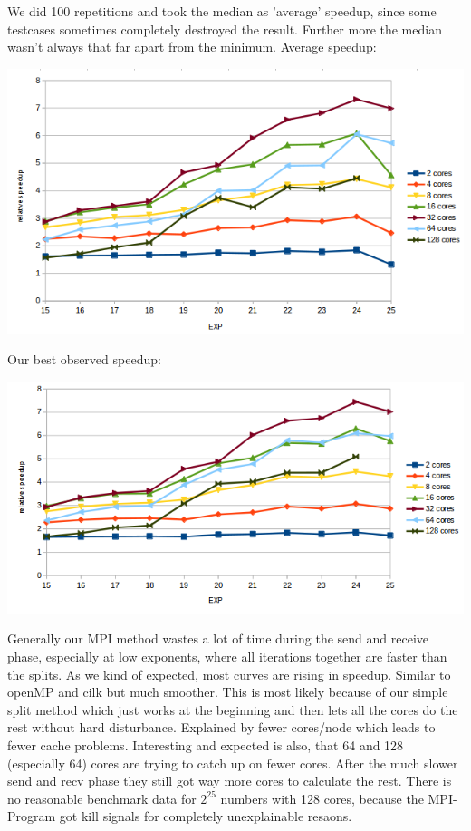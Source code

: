 We did 100 repetitions and took the median as 'average' speedup, since some testcases sometimes completely destroyed the result. Further more the median wasn't always that far apart from the minimum.\newline 
Average speedup:
\begin{center}
\includegraphics[width=\textwidth]{MPI_med}
\end{center}
Our best observed speedup:
\begin{center}
\includegraphics[width=\textwidth]{MPI_best}
\end{center}

Generally our MPI method wastes a lot of time during the send and receive phase, especially at low exponents, where all iterations together are faster than the splits. As we kind of expected, most curves are rising in speedup. Similar to openMP and cilk but much smoother. This is most likely because of our simple split method which just works at the beginning and then lets all the cores do the rest without hard disturbance. Explained by fewer cores/node which leads to fewer cache problems. \newline
Interesting and expected is also, that 64 and 128 (especially 64) cores are trying to catch up on fewer cores. After the much slower send and recv phase they still got way more cores to calculate the rest. There is no reasonable benchmark data for \(2^{25}\) numbers with 128 cores, because the MPI-Program got kill signals for completely unexplainable resaons. \newline


